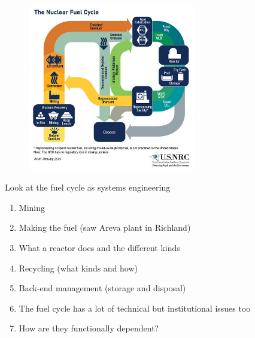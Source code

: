 \documentclass[aspectratio=1610,pdftex,dvipsnames,compress,xcolor={dvipsnames}]{beamer}
\begin{document}
\begin{frame}{}
    \begin{figure}
        \centering
        \includegraphics[width=0.65\textwidth]{nuclear.fuel.cycle3.jpg}
    \end{figure}
\end{frame}


\begin{frame}{Look at the fuel cycle as systems engineering}
    \begin{enumerate}[series=outerlist,topsep=0pt,itemsep=21pt,leftmargin=*,label=(\arabic*)]
        \item[]Mining
        \item[]Making the fuel (saw Areva plant in Richland)
        \item[]What a reactor does and the different kinds
        \item[]Recycling (what kinds and how)
        \item[]Back-end management (storage and disposal)
        \item[]The fuel cycle has a lot of technical but institutional issues too
        \item[]How are they functionally dependent? 
    \end{enumerate}
\end{frame}
\end{document}
